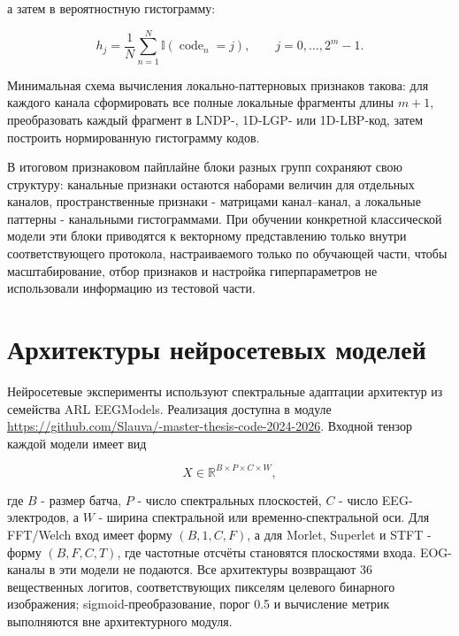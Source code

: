 а затем в вероятностную гистограмму:

\begin{equation}
h_j =
\frac{1}{N}\sum_{n=1}^{N}\mathbb{I}(\operatorname{code}_n = j),
\qquad
j = 0,\dots,2^m-1.
\end{equation}

Минимальная схема вычисления локально-паттерновых признаков такова: для
каждого канала сформировать все полные локальные фрагменты длины $m+1$,
преобразовать каждый фрагмент в LNDP-, 1D-LGP- или 1D-LBP-код, затем
построить нормированную гистограмму кодов.

В итоговом признаковом пайплайне блоки разных групп сохраняют свою структуру:
канальные признаки остаются наборами величин для отдельных каналов,
пространственные признаки - матрицами канал--канал, а локальные паттерны -
канальными гистограммами. При обучении конкретной классической модели эти
блоки приводятся к векторному представлению только внутри соответствующего
протокола, настраиваемого только по обучающей части, чтобы масштабирование,
отбор признаков и настройка
гиперпараметров не использовали информацию из тестовой части.

\section*{Архитектуры нейросетевых моделей}
\label{app:deep-architectures}

Нейросетевые эксперименты используют спектральные адаптации архитектур из
семейства ARL EEGModels. Реализация доступна в модуле
\url{https://github.com/Slauva/-master-thesis-code-2024-2026}.
Входной тензор каждой модели имеет вид

\begin{equation}
X \in \mathbb{R}^{B \times P \times C \times W},
\end{equation}

где $B$ - размер батча, $P$ - число спектральных плоскостей, $C$ - число
EEG-электродов, а $W$ - ширина спектральной или временно-спектральной оси.
Для FFT/Welch вход имеет форму $(B,1,C,F)$, а для Morlet, Superlet и STFT -
форму $(B,F,C,T)$, где частотные отсчёты становятся плоскостями входа.
EOG-каналы в эти модели не подаются. Все архитектуры возвращают 36
вещественных логитов, соответствующих пикселям целевого бинарного изображения;
sigmoid-преобразование, порог 0.5 и вычисление метрик выполняются вне
архитектурного модуля.

